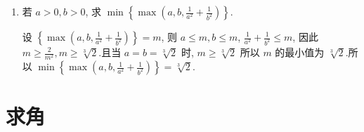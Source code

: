 \begin{enumerate}
\item 若 $a>0, b>0$, 求 $\min \left\{\max \left(a, b, \frac{1}{a^2}+\frac{1}{b^2}\right)\right\}$.
\begin{jieda}
设 $\left\{\max \left(a, b, \frac{1}{a^2}+\frac{1}{b^2}\right)\right\}=m$, 则 $a \leqslant m, b \leqslant m$, $\frac{1}{a^2}+\frac{1}{b^2} \leqslant m$, 因此 $m \geqslant \frac{2}{m^2}, m \geqslant \sqrt[3]{2}$.且当 $a=b=\sqrt[3]{2}$ 时, $m \geqslant \sqrt[3]{2}$ 所以 $m$ 的最小值为 $\sqrt[3]{2}$.所以 $\min \left\{\max \left(a, b, \frac{1}{a^2}+\frac{1}{b^2}\right)\right\}=\sqrt[3]{2}$.
\end{jieda}

\end{enumerate}


\section{求角}
